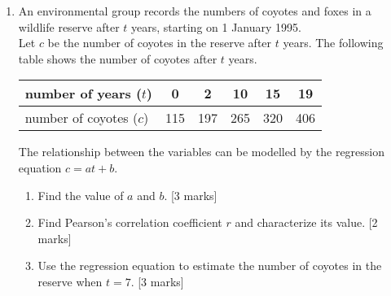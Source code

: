 \documentclass[12pt, twoside]{article}
\begin{document}
\begin{enumerate}
\newpage
\item An environmental group records the numbers of coyotes and foxes in a wildlife reserve after $t$ years, starting on 1 January 1995.\\[0.25cm]
  Let $c$ be the number of coyotes in the reserve after $t$ years. The following table shows the number of coyotes after $t$ years.
    \begin{center}
      \begin{tabular}{|l|c|c|c|c|c|}
        \hline
        number of years ($t$) & 0 & 2 & 10 & 15 & 19 \\ 
        \hline 
        number of coyotes ($c$) & 115 & 197 & 265 & 320 & 406  \\ 
        \hline 
        \end{tabular}
      \end{center}
    The relationship between the variables can be modelled by the regression equation $c=at+b$.
    \begin{enumerate}
      \item Find the value of $a$ and $b$. \hfill [3 marks] \vspace{3cm}
      \item Find Pearson's correlation coefficient $r$ and characterize its value. \hfill [2 marks] \vspace{3cm}
      \item Use the regression equation to estimate the number of coyotes in the reserve when $t=7$. \hfill [3 marks]
    \end{enumerate}


\end{enumerate}
\end{document}
